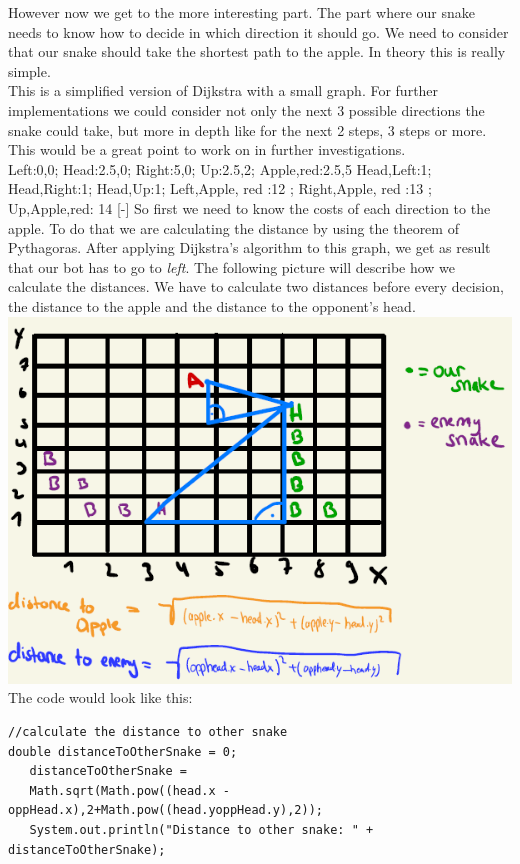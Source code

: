 \documentclass[a4paper,12pt]{article}
\begin{document}
However now we get to the more interesting part. The part where our snake needs to know how to decide in which direction it should go. We need to consider that our snake should take the shortest path to the apple. In theory this is really simple.\\
This is a simplified version of Dijkstra with a small graph. For further implementations we could consider not only the next 3 possible directions the snake could take, but more in depth like for the next 2 steps, 3 steps or more. This would be a great point to work on in further investigations.\\
{
Left:0,0;
Head:2.5,0;
Right:5,0;
Up:2.5,2;
Apple,red:2.5,5
}
{
Head,Left:1;
Head,Right:1;
Head,Up:1; 
Left,Apple, red :12 ;
Right,Apple, red :13 ; 
Up,Apple,red: 14
}[-]
\dijkstra{}
So first we need to know the costs of each direction to the apple. To do that we are calculating the distance by using the theorem of Pythagoras. After applying Dijkstra's algorithm to this graph, we get as result that our bot has to go to \textit{left}. The following picture will describe how we calculate the distances. We have to calculate two distances before every decision, the distance to the apple and the distance to the opponent's head.\\
\includegraphics[scale=0.8]{calcs}
\newpage
The code would look like this:
\begin{verbatim}
//calculate the distance to other snake
double distanceToOtherSnake = 0;
   distanceToOtherSnake =  
   Math.sqrt(Math.pow((head.x - oppHead.x),2+Math.pow((head.yoppHead.y),2));
   System.out.println("Distance to other snake: " + distanceToOtherSnake);
\end{verbatim}
\end{document}
